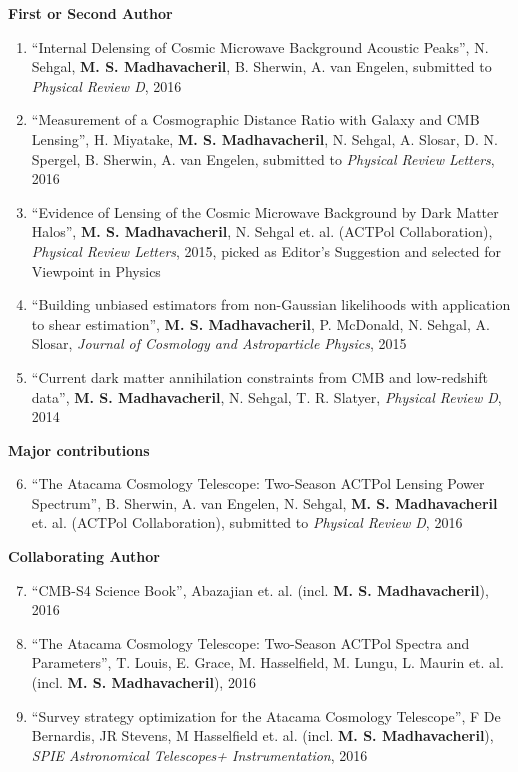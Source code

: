 \documentclass[10pt,margin]{res}
\begin{document}
\begin{resume}
\textbf{First or Second Author}
\\
\begin{enumerate}
\item ``Internal Delensing of Cosmic Microwave Background Acoustic Peaks'', N. Sehgal, {\bf M. S. Madhavacheril}, B. Sherwin, A. van Engelen, submitted to {\sl Physical Review D}, 2016
\item ``Measurement of a Cosmographic Distance Ratio with Galaxy and CMB Lensing'', H. Miyatake, {\bf M. S. Madhavacheril}, N. Sehgal, A. Slosar, D. N. Spergel, B. Sherwin, A. van Engelen, submitted to {\sl Physical Review Letters}, 2016
\item ``Evidence of Lensing of the Cosmic Microwave Background by Dark Matter Halos'', {\bf M. S. Madhavacheril}, N. Sehgal et. al. (ACTPol Collaboration), {\sl Physical Review Letters}, 2015, picked as Editor's Suggestion and selected for Viewpoint in Physics
\item ``Building unbiased estimators from non-Gaussian likelihoods with application to shear estimation'', {\bf M. S. Madhavacheril}, P. McDonald, N. Sehgal, A. Slosar, {\sl Journal of Cosmology and Astroparticle Physics}, 2015
\item ``Current dark matter annihilation constraints from CMB and low-redshift data'', {\bf M. S. Madhavacheril}, N. Sehgal, T. R. Slatyer, {\sl Physical Review D}, 2014
\end{enumerate}
\textbf{Major contributions}
\\
\begin{enumerate}
\setcounter{enumi}{5}
\item ``The Atacama Cosmology Telescope: Two-Season ACTPol Lensing Power Spectrum'', B. Sherwin, A. van Engelen, N. Sehgal, {\bf M. S. Madhavacheril} et. al. (ACTPol Collaboration), submitted to {\sl Physical Review D}, 2016
\end{enumerate}
\textbf{Collaborating Author}
\\
\begin{enumerate}
\setcounter{enumi}{6}
\item ``CMB-S4 Science Book'', Abazajian et. al. (incl. {\bf M. S. Madhavacheril}), 2016
\item ``The Atacama Cosmology Telescope: Two-Season ACTPol Spectra and Parameters'', T. Louis, E. Grace, M. Hasselfield, M. Lungu, L.  Maurin et. al. (incl. {\bf M. S. Madhavacheril}), 2016
\item ``Survey strategy optimization for the Atacama Cosmology Telescope'', F De Bernardis, JR Stevens, M Hasselfield et. al. (incl. {\bf M. S. Madhavacheril}), {\sl SPIE Astronomical Telescopes+ Instrumentation}, 2016

\end{enumerate}
\end{resume}
\end{document}
